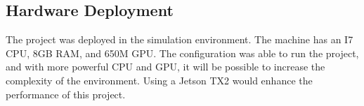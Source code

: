 \documentclass[10pt,journal,compsoc]{IEEEtran}
\begin{document}
\subsection{Hardware Deployment}
The project was deployed in the simulation environment. The machine has an I7 CPU, 8GB RAM, and 650M GPU. The configuration was able to run the project, and with more powerful CPU and GPU, it will be possible to increase the complexity of the environment. Using a Jetson TX2 would enhance the performance of this project.



\end{document}
